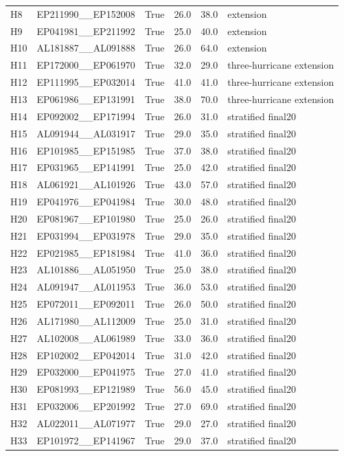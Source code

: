 \begin{longtable}{llllll}
H8 & EP211990\_\_EP152008 & True & 26.0 & 38.0 & extension \\
H9 & EP041981\_\_EP211992 & True & 25.0 & 40.0 & extension \\
H10 & AL181887\_\_AL091888 & True & 26.0 & 64.0 & extension \\
H11 & EP172000\_\_EP061970 & True & 32.0 & 29.0 & three-hurricane extension \\
H12 & EP111995\_\_EP032014 & True & 41.0 & 41.0 & three-hurricane extension \\
H13 & EP061986\_\_EP131991 & True & 38.0 & 70.0 & three-hurricane extension \\
H14 & EP092002\_\_EP171994 & True & 26.0 & 31.0 & stratified final20 \\
H15 & AL091944\_\_AL031917 & True & 29.0 & 35.0 & stratified final20 \\
H16 & EP101985\_\_EP151985 & True & 37.0 & 38.0 & stratified final20 \\
H17 & EP031965\_\_EP141991 & True & 25.0 & 42.0 & stratified final20 \\
H18 & AL061921\_\_AL101926 & True & 43.0 & 57.0 & stratified final20 \\
H19 & EP041976\_\_EP041984 & True & 30.0 & 48.0 & stratified final20 \\
H20 & EP081967\_\_EP101980 & True & 25.0 & 26.0 & stratified final20 \\
H21 & EP031994\_\_EP031978 & True & 29.0 & 35.0 & stratified final20 \\
H22 & EP021985\_\_EP181984 & True & 41.0 & 36.0 & stratified final20 \\
H23 & AL101886\_\_AL051950 & True & 25.0 & 38.0 & stratified final20 \\
H24 & AL091947\_\_AL011953 & True & 36.0 & 53.0 & stratified final20 \\
H25 & EP072011\_\_EP092011 & True & 26.0 & 50.0 & stratified final20 \\
H26 & AL171980\_\_AL112009 & True & 25.0 & 31.0 & stratified final20 \\
H27 & AL102008\_\_AL061989 & True & 33.0 & 36.0 & stratified final20 \\
H28 & EP102002\_\_EP042014 & True & 31.0 & 42.0 & stratified final20 \\
H29 & EP032000\_\_EP041975 & True & 27.0 & 41.0 & stratified final20 \\
H30 & EP081993\_\_EP121989 & True & 56.0 & 45.0 & stratified final20 \\
H31 & EP032006\_\_EP201992 & True & 27.0 & 69.0 & stratified final20 \\
H32 & AL022011\_\_AL071977 & True & 29.0 & 27.0 & stratified final20 \\
H33 & EP101972\_\_EP141967 & True & 29.0 & 37.0 & stratified final20 \\
\bottomrule
\end{longtable}
\endgroup
